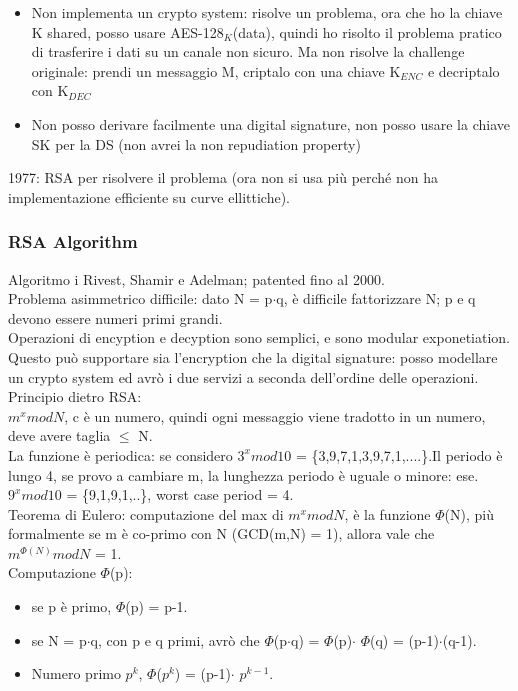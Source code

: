 \documentclass[16px]{article}
\begin{document}
\begin{itemize}
\item Non implementa un crypto system: risolve un problema, ora che ho la chiave K shared, posso usare AES-128$_K$(data), quindi ho risolto il problema pratico di trasferire i dati su un canale non sicuro. Ma non risolve la challenge originale: prendi un messaggio M, criptalo con una chiave K$_{ENC}$ e decriptalo con K$_{DEC}$
\item Non posso derivare facilmente una digital signature, non posso usare la chiave SK per la DS (non avrei la non repudiation property)
\end{itemize}
1977: RSA per risolvere il problema (ora non si usa più perché non ha implementazione efficiente su curve ellittiche).
\subsubsection{RSA Algorithm}
Algoritmo i Rivest, Shamir e Adelman; patented fino al 2000.\\ Problema asimmetrico difficile: dato N = p$\cdot$q, è difficile fattorizzare N; p e q devono essere numeri primi grandi.\\ Operazioni di encyption e decyption sono semplici, e sono modular exponetiation. Questo può supportare sia l'encryption che la digital signature: posso modellare un crypto system ed avrò i due servizi a seconda dell'ordine delle operazioni.\\ Principio dietro RSA:\\ $m^xmodN$, c è un numero, quindi ogni messaggio viene tradotto in un numero, deve avere taglia $\leq$ N.\\ La funzione è periodica: se considero $3^xmod10$ = \{3,9,7,1,3,9,7,1,....\}.Il periodo è lungo 4, se provo a cambiare m, la lunghezza periodo è uguale o minore: ese. $9^xmod10$ = \{9,1,9,1,..\}, worst case period = 4.\\ Teorema di Eulero: computazione del max di $m^xmodN$, è la funzione $\Phi$(N), più formalmente se m è co-primo con N (GCD(m,N) = 1), allora vale che $m^{\Phi(N)}modN$ = 1.\\ Computazione $\Phi$(p):
\begin{itemize}
\item se p è primo, $\Phi$(p) = p-1.
\item se N = p$\cdot$q, con p e q primi, avrò che $\Phi$(p$\cdot$q) = $\Phi$(p)$\cdot$ $\Phi$(q) = (p-1)$\cdot$(q-1).
\item Numero primo $p^k$, $\Phi$($p^k$) = (p-1)$\cdot$ $p^{k-1}$.
\end{itemize}
\end{document}

